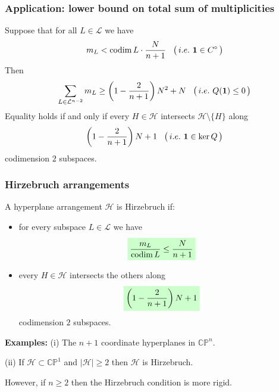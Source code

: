 \documentclass{beamer}
\newcommand{\CP}{\mathbb{CP}}
\newcommand{\mH}{\mathcal{H}}
\newcommand{\mL}{\mathcal{L}}
\DeclareMathOperator{\codim}{codim}
\newcommand{\mathcolorbox}[2]{\colorbox{#1}{$\displaystyle #2$}}
\begin{document}
\begin{frame}
	\frametitle{Application: lower bound on total sum of multiplicities}
	\begin{theorem}[dB-Panov, 2024]\label{thm:hir}
		Suppose that for all \(L \in \mL\) we have
		\begin{equation*}
		m_L < \codim L \cdot \frac{N}{n+1} \hspace{3mm} \big(\,i.e.\,\, \mathbf{1} \in C^{\circ} \,\big)
		\end{equation*}
		Then
		\begin{equation*}
		\sum_{L \in \mL^{n-2}} m_L \geq \left( 1 - \frac{2}{n+1} \right) N^2 + N \hspace{3mm} \big(\,i.e.\,\, Q(\mathbf{1}) \leq 0 \,\big)
		\end{equation*}
		Equality holds if and only if every \(H \in \mH\) intersects \(\mH \setminus \{H\}\) along
		\begin{equation*}
		\left( 1 - \frac{2}{n+1} \right) N + 1 \hspace{3mm} \big(\,i.e.\,\, \mathbf{1} \in \ker Q \,\big)	
		\end{equation*}
		codimension \(2\) subspaces.
	\end{theorem}
\end{frame}


\begin{frame}
	\frametitle{Hirzebruch arrangements}
	A hyperplane arrangement \(\mH\) is Hirzebruch if:
	\begin{itemize}
		\item for every subspace \(L \in \mL\) we have
		\begin{equation*}
		\mathcolorbox{green!20}{
		\frac{m_L}{\codim L} \leq \frac{N}{n+1}
		} 
		\end{equation*}
		
		\item every \(H \in \mH\) intersects the others along
		\begin{equation*}
		\mathcolorbox{green!20}{
		\left( 1 - \frac{2}{n+1} \right) N + 1
		} 
		\end{equation*}
		codimension \(2\) subspaces.
	\end{itemize}

\textbf{Examples:} (i) The \(n+1\) coordinate hyperplanes in \(\CP^n\).

(ii) If \(\mH \subset \CP^1\) and \(|\mH| \geq 2\) then \(\mH\) is Hirzebruch. 

However, if \(n\geq 2\) then the Hirzebruch condition is more rigid.

\end{frame}
\end{document}

